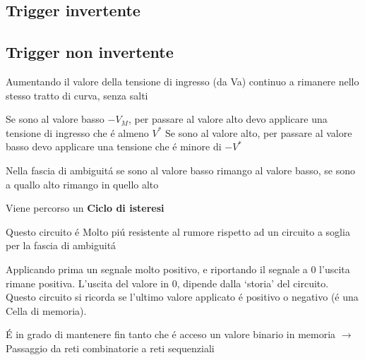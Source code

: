 \documentclass{article}
\begin{document}
\subsection{Trigger invertente}
\begin{center}
\end{center}


\subsection{Trigger non invertente}
\begin{center}
\end{center}

Aumentando il valore della tensione di ingresso (da Va) continuo a rimanere nello stesso tratto di curva, senza salti

Se sono al valore basso $-V_M$, per passare al valore alto devo applicare una tensione di ingresso che \'e almeno $V^*$
Se sono al valore alto, per passare al valore basso devo applicare una tensione che \'e minore di $-V^*$

Nella fascia di ambiguit\'a se sono al valore basso rimango al valore basso, se sono a quallo alto rimango in quello alto

Viene percorso un \textbf{Ciclo di isteresi}

Questo circuito \'e Molto pi\'u resistente al rumore rispetto ad un circuito a soglia per la fascia di ambiguit\'a

Applicando prima un segnale molto positivo, e riportando il segnale a 0 l'uscita rimane positiva. L'uscita del valore in 0, dipende dalla `storia' del circuito. Questo circuito si ricorda se l'ultimo valore applicato \'e positivo o negativo (\'e una Cella di memoria).

\'E in grado di mantenere fin tanto che \'e acceso un valore binario in memoria $\rightarrow$ Passaggio da reti combinatorie a reti sequenziali
\end{document}
